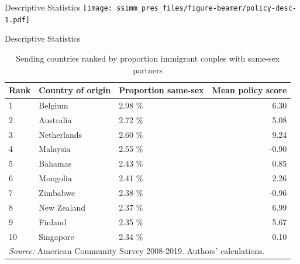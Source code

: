 \documentclass[
  ignorenonframetext,
]{beamer}
\begin{document}
\begin{frame}{Descriptive Statistics}
\protect\hypertarget{descriptive-statistics-1}{}
\texttt{[image: ssimm\_pres\_files/figure-beamer/policy-desc-1.pdf]}
\end{frame}

\begin{frame}{Descriptive Statistics}
\protect\hypertarget{descriptive-statistics-2}{}
\begin{table}

\caption{\label{tab:country-tab}Sending countries ranked by proportion immigrant couples with same-sex partners}
\centering
\fontsize{9}{11}\selectfont
\begin{tabular}[t]{lllr}
\toprule
Rank & Country of origin & Proportion same-sex & Mean policy score\\
\midrule
1 & Belgium & 2.98 \% & 6.30\\
2 & Australia & 2.72 \% & 5.08\\
3 & Netherlands & 2.60 \% & 9.24\\
4 & Malaysia & 2.55 \% & -0.90\\
5 & Bahamas & 2.43 \% & 0.85\\
6 & Mongolia & 2.41 \% & 2.26\\
7 & Zimbabwe & 2.38 \% & -0.96\\
8 & New Zealand & 2.37 \% & 6.99\\
9 & Finland & 2.35 \% & 5.67\\
10 & Singapore & 2.34 \% & 0.10\\
\bottomrule
\multicolumn{4}{l}{\rule{0pt}{1em}\textit{Source:} American Community Survey 2008-2019. Authors' calculations.}\\
\end{tabular}
\end{table}
\end{frame}
\end{document}
